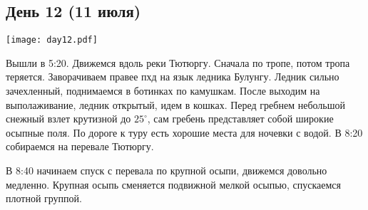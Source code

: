 \graphicspath{{Pictures/Chapter5/Day12}}

\subsection{День 12 (11 июля)}\label{subsec:Day12}
    \parbox[c]{\textwidth}{%
        \texttt{[image: day12.pdf]}\label{fig:Day12_map}%
    }
    \vspace{0.8cm}

    Вышли в 5:20. Движемся вдоль реки Тютюргу. Сначала по тропе, потом тропа теряется. Заворачиваем правее
    пхд на язык ледника Булунгу. Ледник сильно зачехленный, поднимаемся в ботинках по камушкам. После выходим
    на выполаживание, ледник открытый, идем в кошках. Перед гребнем небольшой снежный взлет крутизной до $25^\circ$,
    сам гребень представляет собой широкие осыпные поля. По дороге к туру есть хорошие места для ночевки с водой.
    В 8:20 собираемся на перевале Тютюргу.

    В 8:40 начинаем спуск с перевала по крупной осыпи, движемся довольно медленно. Крупная осыпь сменяется подвижной
    мелкой осыпью, спускаемся плотной группой.

